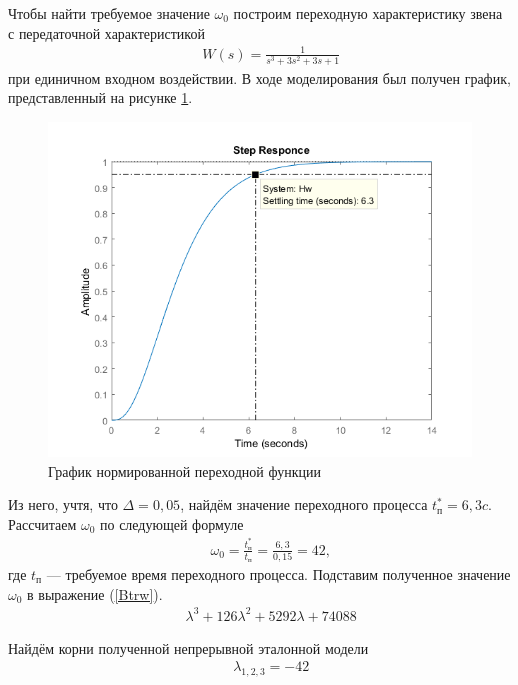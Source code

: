 \documentclass[fleqn, a4paper, 11pt, russian]{article}
\begin{document}
	Чтобы найти требуемое значение $\omega_0$ построим переходную характеристику звена с передаточной характеристикой
	\begin{align}
		&&W(s) = \displaystyle{\frac{1}{s^3 + 3s^2 + 3s + 1}}
	\end{align}
	при единичном входном воздействии. В ходе моделирования был получен график, представленный на рисунке \ref{hWw}.
	\begin{figure}[ht!]
		\centering
		\includegraphics[scale=0.75]{hWw}
		\caption{График нормированной переходной функции}
		\label{hWw}
	\end{figure}
	Из него, учтя, что $\Delta = 0,05$, найдём значение переходного процесса $t_\text{п}^* = 6,3 c$. Рассчитаем $\omega_0$ по следующей формуле
	\begin{align}
		&&\omega_0 = \frac{t_\text{п}^*}{t_\text{п}} = \frac{6,3}{0,15} = 42,
	\end{align}
	где $t_\text{п}$ --- требуемое время переходного процесса. Подставим полученное значение $\omega_0$ в выражение (\ref{Btrw}).
	\begin{align}
		&&\lambda^3 + 126\lambda^2 + 5292\lambda + 74088
	\end{align}

	Найдём корни полученной непрерывной эталонной модели
	\begin{align}
		&&\lambda_{1, 2, 3}= -42
	\end{align}
	
\end{document}
